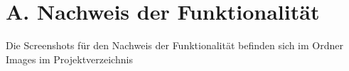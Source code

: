 
\addchap{\langanhang}


\section*{A. Nachweis der Funktionalität}\label{sec:NachweisFunktionalitaet}
Die Screenshots für den Nachweis der Funktionalität befinden sich im Ordner Images im Projektverzeichnis
\pagebreak

 